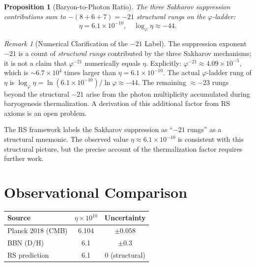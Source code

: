 \documentclass[12pt,a4paper]{article}
\newtheorem{proposition}[theorem]{Proposition}
\theoremstyle{definition}
\theoremstyle{remark}
\newtheorem{remark}[theorem]{Remark}
\begin{document}
\begin{proposition}[Baryon-to-Photon Ratio]
\label{thm:eta}
The three Sakharov suppression contributions sum to $-(8+6+7) = -21$
structural rungs on the $\varphi$-ladder:
\begin{equation}
  \eta = 6.1 \times 10^{-10},
  \quad \log_\varphi \eta \approx -44.
\end{equation}
\end{proposition}

\begin{remark}[Numerical Clarification of the $-21$ Label]
\label{rem:numerical}
The suppression exponent $-21$ is a count of \emph{structural rungs}
contributed by the three Sakharov mechanisms; it is not a claim that
$\varphi^{-21}$ numerically equals $\eta$.  Explicitly:
$\varphi^{-21} \approx 4.09 \times 10^{-5}$, which is $\sim 6.7
\times 10^{4}$ times larger than $\eta = 6.1 \times 10^{-10}$.
The actual $\varphi$-ladder rung of $\eta$ is
$\log_\varphi \eta = \ln(6.1\times10^{-10})/\ln\varphi \approx -44$.
The remaining $\approx -23$ rungs beyond the structural $-21$ arise
from the photon multiplicity accumulated during baryogenesis
thermalization.  A derivation of this additional factor from RS
axioms is an open problem.

The RS framework labels the Sakharov suppression as ``$-21$ rungs''
as a structural mnemonic.  The observed value $\eta \approx 6.1
\times 10^{-10}$ is consistent with this structural picture, but the
precise account of the thermalization factor requires further work.
\end{remark}

\section{Observational Comparison}
\label{sec:comparison}

\begin{center}
\renewcommand{\arraystretch}{1.3}
\begin{tabular}{lcc}
\hline
\textbf{Source} & $\eta \times 10^{10}$ &
\textbf{Uncertainty} \\
\hline
Planck 2018 (CMB) & 6.104 & $\pm 0.058$ \\
BBN (D/H) & 6.1 & $\pm 0.3$ \\
RS prediction & 6.1 & 0 (structural) \\
\hline
\end{tabular}
\end{center}
\end{document}
